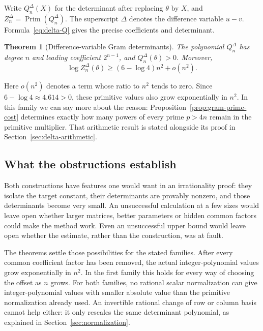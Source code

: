 \documentclass[11pt]{article}
\newtheorem{theorem}{Theorem}[section]
\theoremstyle{definition}
\theoremstyle{remark}
\numberwithin{equation}{section}
\newcommand{\PP}{\operatorname{Prim}}
\begin{document}
Write $Q_n^\Delta(X)$ for the determinant after replacing $\theta$
by $X$, and $Z_n^\Delta=\PP(Q_n^\Delta)$. The superscript $\Delta$
denotes the difference variable $u-v$. Formula~\eqref{eq:delta-Q}
gives the precise coefficients and determinant.

\begin{theorem}[Difference-variable Gram determinants]\label{thm:delta}
The polynomial $Q_n^{\Delta}$ has degree $n$ and leading coefficient
$2^{n-1}$, and $Q_n^{\Delta}(\theta)>0$. Moreover,
\begin{equation}\label{eq:delta-result}
 \log Z_n^{\Delta}(\theta)\geq (6-\log 4)n^2+o(n^2).
\end{equation}
\end{theorem}

Here $o(n^2)$ denotes a term whose ratio to $n^2$ tends to zero.
Since $6-\log4\approx4.614>0$, these primitive values also grow
exponentially in $n^2$. In this family we can say more about the
reason: Proposition~\ref{prop:gram-prime-cost} determines exactly
how many powers of every prime $p>4n$ remain in the primitive
multiplier. That arithmetic result is stated alongside its proof
in Section~\ref{sec:delta-arithmetic}.

\subsection{What the obstructions establish}

Both constructions have features one would want in an irrationality
proof: they isolate the target constant, their determinants are
provably nonzero, and those determinants become very small. An
unsuccessful calculation at a few sizes would leave open whether larger
matrices, better parameters or hidden common factors could make the
method work. Even an unsuccessful upper bound would leave open whether
the estimate, rather than the construction, was at fault.

The theorems settle those possibilities for the stated families.
After every common coefficient factor has been removed, the actual
integer-polynomial values grow exponentially in $n^2$. In the first
family this holds for every way of choosing the offset as $n$ grows.
For both families, no rational scalar normalization can give
integer-polynomial values with smaller absolute value than the primitive
normalization already used. An invertible rational change of row or column basis cannot
help either: it only rescales the same determinant polynomial, as
explained in Section~\ref{sec:normalization}.
\end{document}
